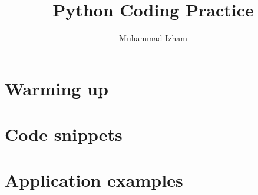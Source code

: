 \documentclass{beamer}
\title[PCP]{Python Coding Practice} %
\author{Muhammad Izham} %
\institute[Universiti Malaysia Perlis] %
{
Universiti Malaysia Perlis \\ %
\medskip
\textit{izham@unimap.edu.my} \\
\textit{sugita5019@gmail.com} \\ %


\textit{https://github.com/izham-sugita}
}
\date{} %
\begin{document}
\begin{frame}
\titlepage %
\end{frame}




\section{Warming up} 





\section{Code snippets}





\section{Application examples}



\end{document}
